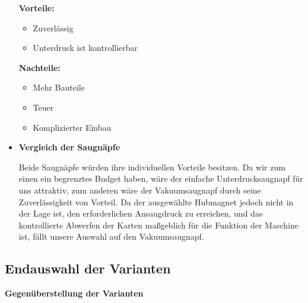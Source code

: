 \begin{itemize}
    \textbf{Vorteile:}
    \begin{itemize}
        \item Zuverlässig
        \item Unterdruck ist kontrollierbar
    \end{itemize}
    \textbf{Nachteile:}
    \begin{itemize}
        \item Mehr Bauteile
        \item Teuer
        \item Komplizierter Einbau
    \end{itemize}
    \item \textbf{Vergleich der Saugnäpfe}


    Beide Saugnäpfe würden ihre individuellen Vorteile besitzen.
    Da wir zum einen ein begrenztes Budget haben, wäre der einfache Unterdrucksaugnapf für uns attraktiv, zum anderen wäre der Vakuumsaugnapf durch seine Zuverlässigkeit von Vorteil.
    Da der ausgewählte Hubmagnet jedoch nicht in der Lage ist, den erforderlichen Ansaugdruck zu erreichen,
    und das kontrollierte Abwerfen der Karten maßgeblich für die Funktion der Maschine ist, fällt unsere Auswahl auf den Vakuumsaugnapf.
\end{itemize}

\subsection{Endauswahl der Varianten}

\textbf{\large{Gegenüberstellung der Varianten}}

